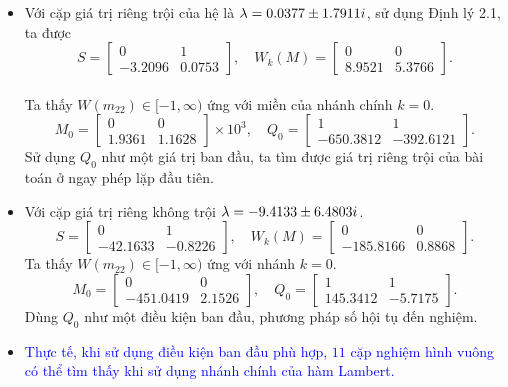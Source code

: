 \documentclass[10pt]{beamer}
\begin{document}
\scriptsize{
	\begin{frame}
		\begin{itemize}
			\item 
			Với cặp giá trị riêng trội của hệ là $\lambda = 0.0377 \pm 1.7911i$, sử dụng Định lý 2.1, ta được 
			\begin{equation*}\label{eq34}
				S= \begin{bmatrix}
					0 & 1 \\ -3.2096 & 0.0753
				\end{bmatrix}, \quad
				W_k(M) = \begin{bmatrix}
					0 & 0 \\ 8.9521 & 5.3766
				\end{bmatrix}.
			\end{equation*}\\
			Ta thấy $W(m_{22}) \in [-1, \infty)$ ứng với miền của nhánh chính $k=0$.
			\begin{equation*}\label{eq36}
				M_0 = \begin{bmatrix}
					0 & 0\\ 1.9361 &1.1628
				\end{bmatrix} \times 10^3 , \quad 
				Q_0 = \begin{bmatrix}
					1 & 1\\ -650.3812 &-392.6121
				\end{bmatrix} .
			\end{equation*}
			Sử dụng $Q_0$ như một giá trị ban đầu, ta tìm được giá trị riêng trội của bài toán ở ngay phép lặp đầu tiên.
			\vskip 0.2cm
			\item
			Với cặp giá trị riêng không trội $\lambda = -9.4133 \pm 6.4803i$. 
			\begin{equation*}\label{eq38}
				S=\begin{bmatrix}
					0&1\\-42.1633 & -0.8226
				\end{bmatrix}, \quad
				W_k(M)=\begin{bmatrix}
					0 & 0\\ -185.8166 & 0.8868
				\end{bmatrix}.
			\end{equation*}
			Ta thấy $W(m_{22}) \in [-1, \infty)$ ứng với nhánh $k =0$. \\
			\begin{equation*}
				M_0= \begin{bmatrix}
					0&0\\ -451.0419 &2.1526
				\end{bmatrix}, \quad 
				Q_0= \begin{bmatrix}
					1&1\\ 145.3412 &-5.7175
				\end{bmatrix}.
			\end{equation*}
			Dùng $Q_0$ như một điều kiện ban đầu, phương pháp số hội tụ đến nghiệm.\\
			\vskip 0.1cm
			\item
			\textcolor{blue}{Thực tế, khi sử dụng điều kiện ban đầu phù hợp, $11$ cặp nghiệm hình vuông có thể tìm thấy khi sử dụng nhánh chính của hàm Lambert.}
		\end{itemize}		
	\end{frame}
}
\end{document}
